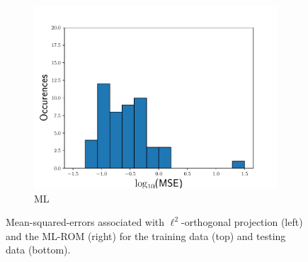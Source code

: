 \documentclass[3p,computermodern,10pt]{elsarticle}
\begin{document}
\begin{figure}
\begin{center}
\begin{subfigure}[t]{0.32\textwidth}
\includegraphics[trim={0cm 0cm 0cm 0cm},clip,width=1.0\linewidth]{code/burgers/synapse_models/basis_study/results/ML_hist_MSE.pdf}
\caption{ML}
\end{subfigure}
\caption{Mean-squared-errors associated with $\ell^2$-orthogonal projection (left) and the ML-ROM (right) for the training data (top) and testing data (bottom).}
\label{fig:burg_training_test_projection_mse}
\end{center}
\end{figure}
\end{document}

